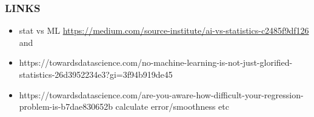 \subsubsection{LINKS}
\begin{itemize}
    \item stat vs ML \url{https://medium.com/source-institute/ai-vs-statistics-c2485f9df126} and 
    \item https://towardsdatascience.com/no-machine-learning-is-not-just-glorified-statistics-26d3952234e3?gi=3f94b919de45
    \item https://towardsdatascience.com/are-you-aware-how-difficult-your-regression-problem-is-b7dae830652b calculate error/smoothness etc
\end{itemize}
